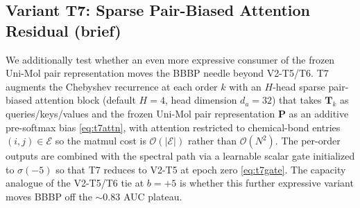 
%



\subsection{Variant T7: Sparse Pair-Biased Attention Residual (brief)}
\label{sec:t7}
We additionally test whether an even more expressive consumer of the
frozen Uni-Mol pair representation moves the BBBP needle beyond V2-T5/T6.
T7 augments the Chebyshev recurrence at each order $k$ with an $H$-head
sparse pair-biased attention block (default $H{=}4$, head dimension
$d_a{=}32$) that takes $\mathbf{T}_k$ as queries/keys/values and the frozen
Uni-Mol pair representation $\mathbf{P}$ as an additive pre-softmax bias
\eqref{eq:t7attn}, with attention restricted to chemical-bond entries
$(i,j)\in\mathcal{E}$ so the matmul cost is $\mathcal{O}(|\mathcal{E}|)$
rather than $\mathcal{O}(N^2)$. The per-order outputs are combined with
the spectral path via a learnable scalar gate initialized to $\sigma({-}5)$
so that T7 reduces to V2-T5 at epoch zero \eqref{eq:t7gate}. The capacity
analogue of the V2-T5/T6 tie at $b{=}{+}5$ is whether this further
expressive variant moves BBBP off the $\sim$$0.83$ AUC plateau.


%


